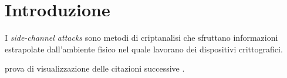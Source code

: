 \chapter{Introduzione}
	I \emph{side-channel attacks} sono metodi di criptanalisi che sfruttano informazioni estrapolate dall'ambiente fisico nel quale lavorano dei dispositivi crittografici\cite{canteaut2006understanding}.
	
	prova di visualizzazione delle citazioni successive \cite{kocher2018spectre}.
